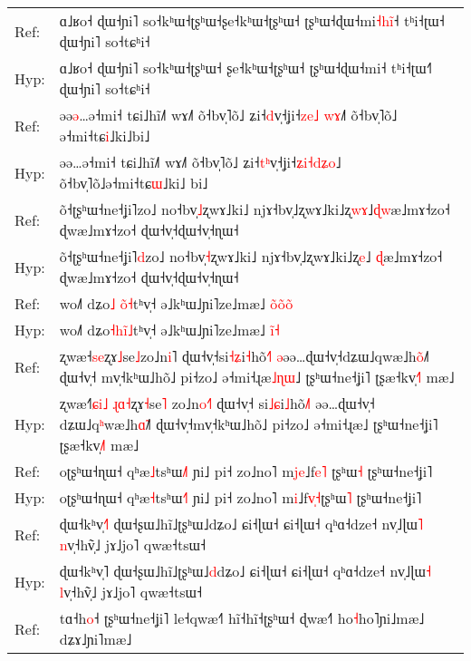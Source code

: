 \documentclass[10pt]{article}
\DeclareRobustCommand{\hl}[1]{{\textcolor{red}{#1}}}
\begin{document}
\begin{longtable}{ll}
\midrule 
Ref: & ɑ˩ʁo˧ ɖɯ˧ɲi˥ so˧kʰɯ˧ʈʂʰɯ˧ʂe˧kʰɯ˧ʈʂʰɯ˧ ʈʂʰɯ˧ɖɯ˧mi\hl{˧}\hl{h}\hl{i}\hl{̃}˧ tʰi˧ʈɯ˧ ɖɯ˧ɲi˥ so˧tɕʰi˧ \\ 
Hyp: & ɑ˩ʁo˧ ɖɯ˧ɲi˥ so˧kʰɯ˧ʈʂʰɯ˧\hl{ }ʂe˧kʰɯ˧ʈʂʰɯ˧ ʈʂʰɯ˧ɖɯ˧mi˧ tʰi˧ʈɯ˧\hl{˥} ɖɯ˧ɲi˥ so˧tɕʰi˧ \\ 
\midrule 
Ref: & əə\hl{ə}…ə˧mi˧ tɕi˩hĩ˩˥ wɤ˩˥ õ˧bv̩˥õ˩ ʑi˧\hl{d}v̩˧ʝi˧\hl{z}\hl{e}\hl{˩}\hl{ }\hl{w}\hl{ɤ}˩\hl{˥} õ˧bv̩˥õ˩\hl{ }ə˧mi˧tɕ\hl{i}˩ki˩bi˩ \\ 
Hyp: & əə…ə˧mi˧ tɕi˩hĩ˩˥ wɤ˩˥ õ˧bv̩˥õ˩ ʑi˧\hl{t}\hl{ʰ}v̩˧ʝi˧\hl{ʑ}\hl{i}\hl{˧}\hl{d}\hl{ʑ}\hl{o}˩ õ˧bv̩˥õ˩ə˧mi˧tɕ\hl{ɯ}˩ki˩\hl{ }bi˩ \\ 
\midrule 
Ref: & õ˧ʈʂʰɯ˧ne˧ʝi˥zo˩ no˧bv̩\hl{˩}ʐwɤ˩ki˩ njɤ˧bv̩˩ʐwɤ˩ki˩ʐ\hl{w}\hl{ɤ}˩\hl{ɖ}\hl{w}æ˩mɤ˧zo˧ ɖwæ˩mɤ˧zo˧ ɖɯ˧v̩˧ɖɯ˧v̩˧ɳɯ˧ \\ 
Hyp: & õ˧ʈʂʰɯ˧ne˧ʝi˥\hl{d}zo˩ no˧bv̩\hl{˧}ʐwɤ˩ki˩ njɤ˧bv̩˩ʐwɤ˩ki˩ʐ\hl{e}˩\hl{ }\hl{ɖ}æ˩mɤ˧zo˧ ɖwæ˩mɤ˧zo˧ ɖɯ˧v̩˧ɖɯ˧v̩˧ɳɯ˧ \\ 
\midrule 
Ref: & wo˩˥ dʑo\hl{˩}\hl{ }\hl{o}̃\hl{˧}tʰv̩˧ ə˩kʰɯ˩ɲi˥ze˩mæ˩ \hl{o}̃\hl{o}\hl{̃}\hl{o}\hl{̃} \\ 
Hyp: & wo˩˥ dʑo\hl{˧}\hl{h}\hl{i}̃\hl{˩}tʰv̩˧ ə˩kʰɯ˩ɲi˥ze˩mæ˩ \hl{i}̃\hl{˧} \\ 
\midrule 
Ref: & ʐwæ˧\hl{s}\hl{e}ʐɤ\hl{˩}se\hl{˩}zo˩n\hl{i}˥ ɖɯ˧v̩˧si\hl{˧}\hl{ʑ}i\hl{˧}hõ\hl{˧}˥ \hl{ə}əə…ɖɯ˧v̩˧dʑɯ˩qwæ˩h\hl{o}̃˩˥ ɖɯ˧v̩˧\hl{ }mv̩˧kʰɯ˩hõ˩ pi˧zo˩ ə˧mi˧ɻæ\hl{˩}\hl{ɳ}\hl{ɯ}˩ ʈʂʰɯ˧ne˧ʝi˥ ʈʂæ˧kv̩\hl{˧}˥ mæ˩ \\ 
Hyp: & ʐwæ˧\hl{˥}\hl{ɕ}\hl{i}\hl{˩}\hl{ }\hl{ɻ}\hl{ɑ}\hl{˧}ʐɤ\hl{˧}se\hl{˥}\hl{ }zo˩n\hl{o}\hl{˧}˥ ɖɯ˧v̩˧\hl{ }si\hl{˩}\hl{ɕ}i\hl{˩}hõ\hl{˩}˥ əə…ɖɯ˧v̩˧\hl{ }dʑɯ˩q\hl{ʰ}wæ˩h\hl{ɑ}̃˩˥ ɖɯ˧v̩˧mv̩˧kʰɯ˩hõ˩ pi˧zo˩ ə˧mi˧ɻæ˩ ʈʂʰɯ˧ne˧ʝi˥ ʈʂæ˧kv̩\hl{˩}˥ mæ˩ \\ 
\midrule 
Ref: & oʈʂʰɯ˧ɳɯ˧ qʰæ\hl{˩}tsʰɯ\hl{˩}˥ ɲi˩ pi˧ zo˩no˥ m\hl{j}\hl{e}˩f\hl{e}\hl{˥}\hl{ }ʈʂʰɯ\hl{˧} ʈʂʰɯ˧ne˧ʝi˥ \\ 
Hyp: & oʈʂʰɯ˧ɳɯ˧ qʰæ\hl{˧}tsʰɯ\hl{˧}˥ ɲi˩ pi˧ zo˩no˥ m\hl{i}˩f\hl{v}\hl{̩}\hl{˧}ʈʂʰɯ\hl{˥} ʈʂʰɯ˧ne˧ʝi˥ \\ 
\midrule 
Ref: & ɖɯ˧kʰv̩\hl{˧}˥ ɖɯ˧ʂɯ˩hĩ˩ʈʂʰɯ˩dʑo˩ ɕi˧ɭɯ˧ ɕi˧ɭɯ˧ qʰɑ˧dze˧ nv̩˩ɭɯ\hl{˥} \hl{n}v̩˧hṽ̩˩ jɤ˩jo˥ qwæ˧tsɯ˧ \\ 
Hyp: & ɖɯ˧kʰv̩˥ ɖɯ˧ʂɯ˩hĩ˩ʈʂʰɯ˩\hl{d}dʑo˩ ɕi˧ɭɯ˧ ɕi˧ɭɯ˧ qʰɑ˧dze˧ nv̩˩ɭɯ\hl{˧} \hl{l}v̩˧hṽ̩˩ jɤ˩jo˥ qwæ˧tsɯ˧ \\ 
\midrule 
Ref: & tɑ˧h\hl{o}˧ ʈʂʰɯ˧ne˧ʝi˥ le˧qwæ˧˥ hĩ˧hĩ˧ʈʂʰɯ˧ ɖwæ˧˥ ho\hl{˧}ho˥ɲi˩mæ˩ dʑɤ˩ɲi˥mæ˩ \\ 

\end{longtable}
\end{document}
